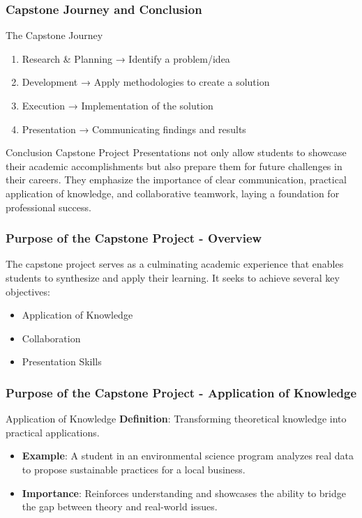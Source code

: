 \documentclass{beamer}
\begin{document}
\begin{frame}[fragile]
    \frametitle{Capstone Journey and Conclusion}
    \begin{block}{The Capstone Journey}
        \begin{enumerate}
            \item Research \& Planning → Identify a problem/idea
            \item Development → Apply methodologies to create a solution
            \item Execution → Implementation of the solution
            \item Presentation → Communicating findings and results
        \end{enumerate}
    \end{block}
    
    \begin{block}{Conclusion}
        Capstone Project Presentations not only allow students to showcase their academic accomplishments but also prepare them for future challenges in their careers. They emphasize the importance of clear communication, practical application of knowledge, and collaborative teamwork, laying a foundation for professional success.
    \end{block}
\end{frame}

\begin{frame}[fragile]
    \frametitle{Purpose of the Capstone Project - Overview}
    The capstone project serves as a culminating academic experience that enables students to synthesize and apply their learning. It seeks to achieve several key objectives:
    \begin{itemize}
        \item Application of Knowledge
        \item Collaboration
        \item Presentation Skills
    \end{itemize}
\end{frame}

\begin{frame}[fragile]
    \frametitle{Purpose of the Capstone Project - Application of Knowledge}
    \begin{block}{Application of Knowledge}
        \textbf{Definition}: Transforming theoretical knowledge into practical applications.
    \end{block}
    \begin{itemize}
        \item \textbf{Example}: A student in an environmental science program analyzes real data to propose sustainable practices for a local business.
        \item \textbf{Importance}: Reinforces understanding and showcases the ability to bridge the gap between theory and real-world issues.
    \end{itemize}
\end{frame}
\end{document}

